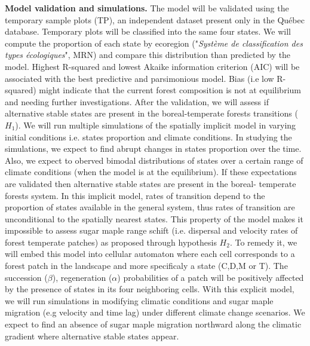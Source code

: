\textbf{Model validation and simulations.}  The model will be validated using
the temporary sample plots (TP), an independent dataset present only in the
Québec database. Temporary plots will be classified into the same four states.
We will compute the proportion of each state by ecoregion ("\textit{Système de
classification des types écologiques}", MRN) and compare this distribution
than predicted by the model.  Highest R-squared and lowest Akaike information
criterion (AIC) will be associated with the best predictive and parsimonious
model. Bias (i.e low R-squared) might indicate that the current forest
composition is not at equilibrium and needing further investigations. After
the validation, we will assess if alternative stable states are present in the
boreal-temperate forests transitions ($H_1$). We will run multiple simulations
of the spatially implicit model in varying initial conditions i.e. states
proportion and climate conditions. In studying the simulations, we expect to
find abrupt changes in states proportion over the time. Also, we expect to
oberved bimodal distributions of states over a certain range of climate
conditions (when the model is at the equilibrium). If these expectations are
validated then alternative stable states are present in the boreal- temperate
forests system.  In this implicit model, rates of transition depend to the
proportion of states available in the general system, thus rates of transition
are unconditional to the spatially nearest states. This property of the model
makes it impossible to assess sugar maple range schift (i.e. dispersal and
velocity rates of forest temperate patches) as proposed through hypothesis
$H_2$. To remedy it, we will embed this model into cellular automaton where
each cell corresponds to a forest patch in the landscape and more specificaly
a state (C,D,M or T). The succession ($\beta$), regeneration ($\alpha$)
probabilities of a patch will be positively affected by the presence of states
in its four neighboring cells.  With this explicit model, we will run
simulations in modifying climatic conditions and  sugar maple migration (e.g
velocity and time lag) under different climate change scenarios. We expect to
find an absence of sugar maple migration northward along the climatic gradient
where alternative stable states appear.


\clearpage

